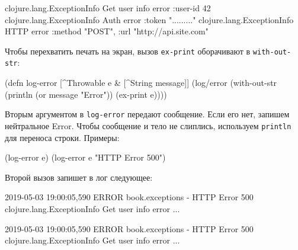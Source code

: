 \else

\begin{english}
  \begin{clojure}
clojure.lang.ExceptionInfo
  Get user info error
  {:user-id 42}
clojure.lang.ExceptionInfo
  Auth error
  {:token "........."}
clojure.lang.ExceptionInfo
  HTTP error
  {:method "POST", :url "http://api.site.com"}
  \end{clojure}
\end{english}

\fi


Чтобы перехватить печать на экран, вызов \verb|ex-print| оборачивают в
\verb|with-out-str|:

\begin{english}
  \begin{clojure}
(defn log-error
  [^Throwable e & [^String message]]
  (log/error
   (with-out-str
     (println (or message "Error"))
     (ex-print e))))
  \end{clojure}
\end{english}

Вторым аргументом в \verb|log-error| передают сообщение. Если его нет, запишем
нейтральное Error. Чтобы сообщение и тело не слиплись, используем
\verb|println| для переноса строки. Примеры:

\begin{english}
  \begin{clojure}
(log-error e)
(log-error e "HTTP Error 500")
  \end{clojure}
\end{english}

Второй вызов запишет в лог следующее:

\ifx\devicetype\mobile

\begin{english}
  \begin{text}
2019-05-03 19:00:05,590 ERROR
book.exceptions - HTTP Error 500
clojure.lang.ExceptionInfo
  Get user info error
  ...
  \end{text}
\end{english}

\else

\begin{english}
  \begin{text}
2019-05-03 19:00:05,590 ERROR book.exceptions - HTTP Error 500
clojure.lang.ExceptionInfo
  Get user info error
  ...
  \end{text}
\end{english}

